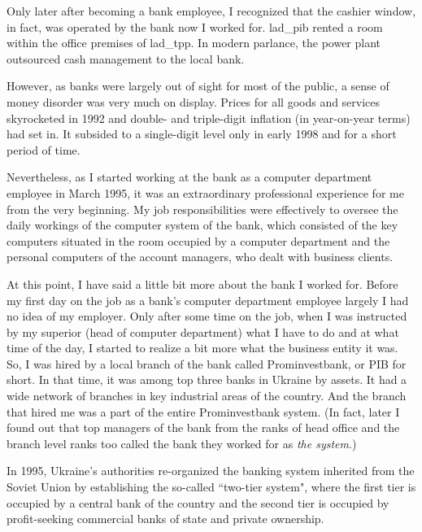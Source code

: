 Only later after becoming a bank employee, I recognized that the cashier window, in fact, was operated by the bank now I worked for. \ac{lad_pib} rented a room within the office premises of \ac{lad_tpp}. In modern parlance, the power plant outsourced cash management to the local bank.

However, as banks were largely out of sight for most of the public, a sense of money disorder was very much on display. Prices for all goods and services skyrocketed in 1992 and double- and triple-digit inflation (in year-on-year terms) had set in. It subsided to a single-digit level only in early 1998 and for a short period of time.

Nevertheless, as I started working at the bank as a computer department employee in March 1995, it was an extraordinary professional experience for me from the very beginning. My job responsibilities were effectively to oversee the daily workings of the computer system of the bank, which consisted of the key computers situated in the room occupied by a computer department and the personal computers of the account managers, who dealt with business clients. 

At this point, I have said a little bit more about the bank I worked for. Before my first day on the job as a bank's computer department employee largely I had no idea of my employer. Only after some time on the job, when I was instructed by my superior (head of computer department) what I have to do and at what time of the day, I started to realize a bit more what the business entity it was. So, I was hired by a local branch of the bank called Prominvestbank, or PIB for short. In that time, it was among top three banks in Ukraine by assets. It had a wide network of branches in key industrial areas of the country. And the branch that hired me was a part of the entire Prominvestbank system. (In fact, later I found out that top managers of the bank from the ranks of head office and the branch level ranks too called the bank they worked for as \textit{the system}.)

In 1995, Ukraine's authorities re-organized the banking system inherited from the Soviet Union by establishing the so-called ``two-tier system", where the first tier is occupied by a central bank of the country and the second tier is occupied by profit-seeking commercial banks of state and private ownership.

